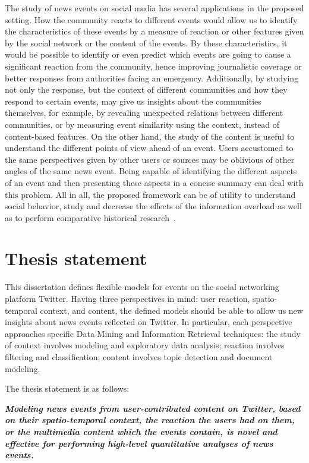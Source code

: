 The study of news events on social media has several applications in the
proposed setting. 
%
How the community reacts to different events would allow us to identify the
characteristics of these events by a measure of reaction or other features given
by the social network or the content of the events. 
%
By these characteristics, it would be possible to identify or even predict which
events are going to cause a significant reaction from the community, hence
improving journalistic coverage or better responses from authorities facing an
emergency.
%
Additionally, by studying not only the response, but the context of different
communities and how they respond to certain events, may give us insights about
the communities themselves, for example, by revealing unexpected relations
between different communities, or by measuring event similarity using the
context, instead of content-based features. 
%
On the other hand, the study of the content is useful to understand the
different points of view ahead of an event. 
%
Users accustomed to the same perspectives given by other users or sources may be
oblivious of other angles of the same news event. 
%
Being capable of identifying the different aspects of an event and then presenting
these aspects in a concise summary can deal with this problem. 
%
All in all, the proposed framework can be of utility to understand social
behavior, study and decrease the effects of the information overload as well
as to perform comparative historical research~\cite{wiki:comparative}.


\section*{Thesis statement} 
%
This dissertation defines flexible models for events on the social
networking platform Twitter. 
%
Having three perspectives in mind: user reaction, spatio-temporal context, and
content, the defined models should be able to allow us new insights
about news events reflected on Twitter. 
%
In particular, each perspective approaches specific Data Mining and Information
Retrieval techniques: 
%
the study of context involves modeling and exploratory data analysis; 
%
reaction involves filtering and classification;
%
content involves topic detection and document modeling.

The thesis statement is as follows:

{\bf \em
Modeling news events from user-contributed content on Twitter, based on
their spatio-temporal context, the reaction the users had on them, or the
multimedia content which the events contain, is novel and effective for performing
high-level quantitative analyses of news events.
}

